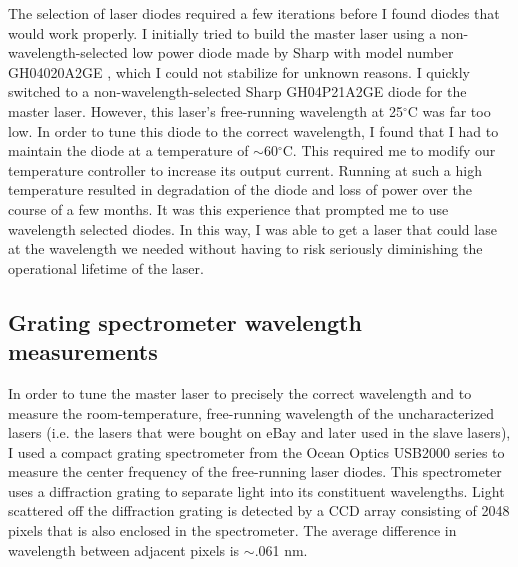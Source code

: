 
The selection of laser diodes required a few iterations before I found diodes that would work properly. I initially tried to build the master laser using a non-wavelength-selected low power diode made by Sharp with model number GH04020A2GE , which I could not stabilize for unknown reasons. I quickly switched to a non-wavelength-selected Sharp GH04P21A2GE diode for the master laser. However, this laser's free-running wavelength at 25$^\circ$C was far too low. In order to tune this diode to the correct wavelength, I found that I had to maintain the diode at a temperature of $\sim$60$^\circ$C. This required me to modify our temperature controller to increase its output current. Running at such a high temperature resulted in degradation of the diode and loss of power over the course of a few months. It was this experience that prompted me to use wavelength selected diodes. In this way, I was able to get a laser that could lase at the wavelength we needed without having to risk seriously diminishing the operational lifetime of the laser.


\subsection{Grating spectrometer wavelength measurements}
\label{gratingSpectrometerWavelengthMeasurements}
In order to tune the master laser to precisely the correct wavelength and to measure the room-temperature, free-running wavelength of the uncharacterized lasers (i.e. the lasers that were bought on eBay and later used in the slave lasers), I used a compact grating spectrometer from the Ocean Optics USB2000 series to measure the center frequency of the free-running laser diodes. This spectrometer uses a diffraction grating to separate light into its constituent wavelengths. Light scattered off the diffraction grating is detected by a CCD array consisting of 2048 pixels that is also enclosed in the spectrometer. The average difference in wavelength between adjacent pixels is $\sim$.061 nm. %

